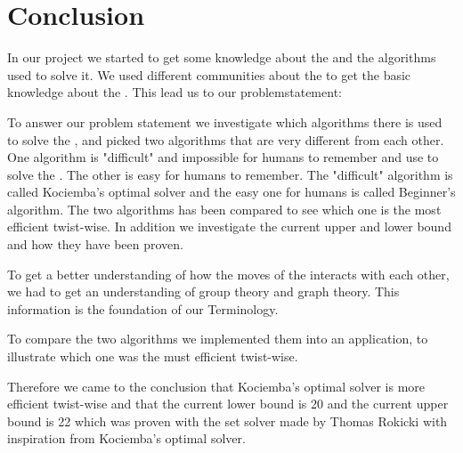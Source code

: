 \chapter{Conclusion}
In our project we started to get some knowledge about the \rubik{} and the algorithms used to solve it. We used different communities about the \rubik{} to get the basic knowledge about the \rubik{}. This lead us to our problemstatement:
%


\linebreak

To answer our problem statement we investigate which algorithms there is used to solve the \rubik{}, and picked two algorithms that are very different from each other. 
One algorithm is "difficult" and impossible for humans to remember and use to solve the \rubik{}. 
The other is easy for humans to remember. 
The "difficult" algorithm is called Kociemba's optimal solver and the easy one for humans is called Beginner's algorithm. 
The two algorithms has been compared to see which one is the most efficient twist-wise. 
In addition we investigate the current upper and lower bound and how they have been proven.

To get a better understanding of how the moves of the \rubik{} interacts with each other, we had to get an understanding of group theory and graph theory. This information is the foundation of our Terminology.

To compare the two algorithms we implemented them into an application, to illustrate which one was the must efficient twist-wise. 

Therefore we came to the conclusion that Kociemba's optimal solver is more efficient twist-wise and that the current lower bound is 20 and the current upper bound is 22 which was proven with the set solver made by Thomas Rokicki with inspiration from Kociemba's optimal solver.

